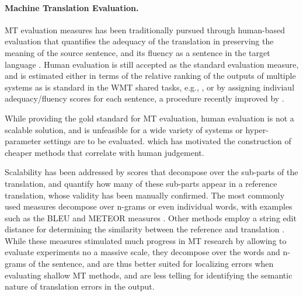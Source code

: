 \documentclass[11pt]{article}
\newcommand{\secref}[1]{Section \ref{#1}}
\begin{document}


\paragraph{Machine Translation Evaluation.}
MT evaluation measures has been traditionally pursued through human-based
evaluation that quantifies the adequacy of the translation in preserving the meaning 
of the source sentence, and its fluency as a sentence in the target language \cite{lopez2008statistical}.
Human evaluation is still accepted as the standard evaluation measure, and is
estimated either in terms of the relative ranking of the outputs of multiple systems
as is standard in the WMT shared tasks, e.g., \cite{bojar2015findings}, or by assigning
indiviaul adequacy/fluency scores for each sentence, a procedure recently improved
by .

While providing the gold standard for MT evaluation, human evaluation is not a scalable solution,
and is unfeasible for a wide variety of systems or hyper-parameter settings are to be evaluated.
which has motivated the construction of cheaper methods that correlate with human
judgement.

Scalability has been addressed by scores that decompose over the sub-parts of
the translation, and quantify how many of these sub-parts appear in a reference translation,
whose validity has been manually confirmed. The most commonly used measures decompose
over n-grams or even individual words, with examples such as
the BLEU \cite{Papineni:2002} and METEOR measures \cite{Banerjee:2005}.
Other methods employ a string edit distance for determining the similarity between the
reference and translation \cite{snover2006study}.
While these measures stimulated much progress in MT research by allowing
to evaluate experiments no a massive scale, they 
decompose over the words and n-grams of the sentence,
and are thus better suited for localizing errors
when evaluating shallow MT methods, and are less telling for identifying the semantic
nature of translation errors in the output. 
\end{document}
